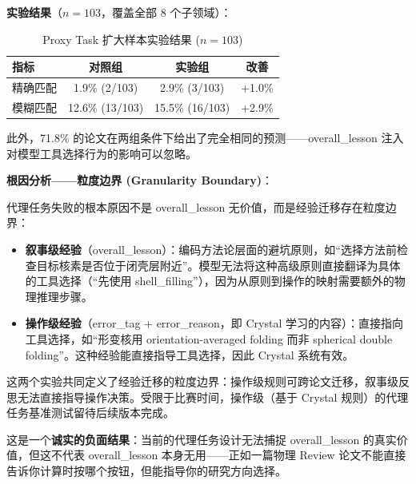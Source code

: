 \documentclass[12pt,a4paper]{article}
\begin{document}
\textbf{实验结果}（$n=103$，覆盖全部 8 个子领域）：

\begin{table}[h]
\centering
\caption{Proxy Task 扩大样本实验结果 ($n=103$)}
\begin{tabular}{lccc}
\toprule
\textbf{指标} & \textbf{对照组} & \textbf{实验组} & \textbf{改善} \\
\midrule
精确匹配 & 1.9\% (2/103) & 2.9\% (3/103) & +1.0\% \\
模糊匹配 & 12.6\% (13/103) & 15.5\% (16/103) & +2.9\% \\
\bottomrule
\end{tabular}
\end{table}

此外，71.8\% 的论文在两组条件下给出了完全相同的预测——overall\_lesson 注入对模型工具选择行为的影响可以忽略。

\textbf{根因分析——粒度边界 (Granularity Boundary)}：

代理任务失败的根本原因不是 overall\_lesson 无价值，而是经验迁移存在粒度边界：

\begin{itemize}
\item \textbf{叙事级经验}（overall\_lesson）：编码方法论层面的避坑原则，如“选择方法前检查目标核素是否位于闭壳层附近”。模型无法将这种高级原则直接翻译为具体的工具选择（“先使用 shell\_filling”），因为从原则到操作的映射需要额外的物理推理步骤。
\item \textbf{操作级经验}（error\_tag + error\_reason，即 Crystal 学习的内容）：直接指向工具选择，如“形变核用 orientation-averaged folding 而非 spherical double folding”。这种经验能直接指导工具选择，因此 Crystal 系统有效。
\end{itemize}

这两个实验共同定义了经验迁移的粒度边界：操作级规则可跨论文迁移，叙事级反思无法直接指导操作决策。受限于比赛时间，操作级（基于 Crystal 规则）的代理任务基准测试留待后续版本完成。

这是一个\textbf{诚实的负面结果}：当前的代理任务设计无法捕捉 overall\_lesson 的真实价值，但这不代表 overall\_lesson 本身无用——正如一篇物理 Review 论文不能直接告诉你计算时按哪个按钮，但能指导你的研究方向选择。

\end{document}
